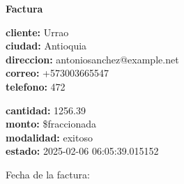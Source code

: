 \documentclass{article}
\begin{document}
\begin{center}
    {\LARGE \textbf{Factura}}\\[1cm]
\end{center}

\textbf{cliente:} Urrao \\
\textbf{ciudad:} Antioquia \\
\textbf{direccion:} antoniosanchez@example.net \\
\textbf{correo:} +573003665547 \\
\textbf{telefono:} 472 \\

\vspace{0.5cm}

\textbf{cantidad:} 1256.39 \\
\textbf{monto:} \$fraccionada \\
\textbf{modalidad:} exitoso \\
\textbf{estado:} 2025-02-06 06:05:39.015152 \\

\vspace{1cm}

Fecha de la factura: 
\end{document}
